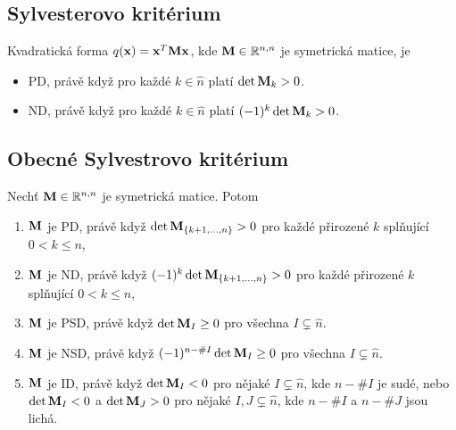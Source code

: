 \subsection*{Sylvesterovo kritérium}

Kvadratická forma $q(\mathbf{x}) = \mathbf{x}^T \mathbf{M} \mathbf{x}$, kde $\mathbf{M} \in \mathbb{R}^{n,n}$ je
symetrická matice, je

\begin{itemize}
    \item PD, právě když pro každé $k \in \hat n$ platí $\det \mathbf{M}_k > 0$.
    \item ND, právě když pro každé $k \in \hat n$ platí $(-1)^k \det \mathbf{M}_k > 0$.
\end{itemize}

\subsection*{Obecné Sylvestrovo kritérium}

Nechť $\mathbf{M} \in \mathbb{R}^{n,n}$ je symetrická matice.
  Potom

\begin{enumerate}
    \item $\mathbf{M}$ je PD, právě když $\det \mathbf{M}_{\{k+1,\ldots,n\}} > 0$ pro každé přirozené $k$ splňující $0 < k \leq n$,
    \item $\mathbf{M}$ je ND, právě když $(-1)^k \det \mathbf{M}_{\{k+1,\ldots,n\}} > 0$ pro každé přirozené $k$ splňující $0 < k \leq n$,
    \item $\mathbf{M}$ je PSD, právě když $\det \mathbf{M}_I \geq 0$ pro všechna $I \subsetneq \hat n$.
    \item $\mathbf{M}$ je NSD, právě když $(-1)^{n - \# I}\det \mathbf{M}_I \geq 0$ pro všechna $I \subsetneq \hat n$.
    \item $\mathbf{M}$ je ID, právě když $\det \mathbf{M}_I < 0$ pro nějaké $I \subsetneq \hat n$, kde $n - \# I$ je sudé, nebo $\det \mathbf{M}_I < 0$ a $\det \mathbf{M}_J > 0$ pro nějaké $I,J \subsetneq \hat n$, kde $n - \# I$ a $n - \# J$ jsou lichá.
\end{enumerate}


\pagebreak